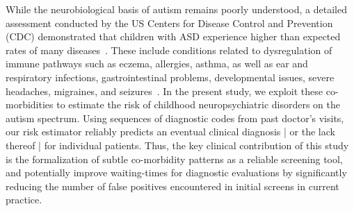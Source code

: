 \documentclass[onecolumn,,10pt]{IEEEtran}
\begin{document}
While the neurobiological basis of autism remains poorly understood,  a detailed assessment conducted by the US Centers for Disease Control and Prevention (CDC) demonstrated that  children with ASD experience  higher than expected rates of many diseases~\cite{cdc}.
%
%
%
These 
include conditions related to dysregulation of immune pathways such as eczema, allergies, asthma, as well as ear and respiratory infections, gastrointestinal problems, developmental issues, severe headaches, migraines, and seizures~\cite{pmid30733689,pmid22511918}. In the present study, we exploit   these   co-morbidities to estimate the risk of  childhood neuropsychiatric disorders on the autism spectrum. Using sequences of diagnostic codes from past doctor's visits, our risk estimator reliably
predicts an eventual clinical  diagnosis | or the lack thereof |  for individual patients.
Thus, the key clinical  contribution of this study is the formalization  of subtle co-morbidity patterns as a reliable screening tool, and potentially  improve waiting-times for diagnostic evaluations by significantly reducing the number of false positives encountered in initial screens in current practice.
\end{document}

